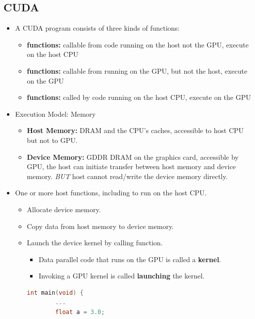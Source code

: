 \documentclass[../main.tex]{subfiles}
\begin{document}
\subsection{CUDA}

\begin{itemize}
	\item A CUDA program consists of three kinds of functions:
	      \begin{itemize}
		      \item {\textbf{ functions:} callable from code running on the host not the GPU, execute on the host CPU}
		      \item {\textbf{ functions:} callable from running on the GPU, but not the host, execute on the GPU}
		      \item {\textbf{ functions:} called by code running on the host CPU, execute on the GPU}
	      \end{itemize}
	\item Execution Model: Memory
	      \begin{itemize}
		      \item \textbf{Host Memory:} DRAM and the CPU's caches, accessible to host CPU but not to GPU.
		      \item \textbf{Device Memory:} GDDR DRAM on the graphics card, accessible by GPU, the host can initiate transfer between host memory and device memory. \textit{BUT} host cannot read/write the device memory directly.
	      \end{itemize}
	\item One or more host functions, including  to run on the host CPU.
	      \begin{itemize}
		      \item Allocate device memory.
		      \item Copy data from host memory to device memory.
		      \item Launch the device kernel by calling  function.
		            \begin{itemize}
			            \item Data parallel code that runs on the GPU is called a \textbf{kernel}.
			            \item Invoking a GPU kernel is called \textbf{launching} the kernel.
		            \end{itemize}
		            \begin{lstlisting}[language=c]
    int main(void) {
        ...
        float a = 3.0;

\end{lstlisting}
\end{itemize}
\end{itemize}
\end{document}
